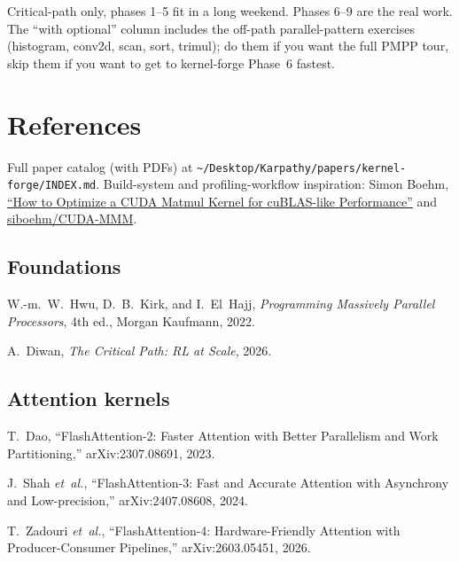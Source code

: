 \documentclass[11pt, letterpaper]{article}
\begin{document}
\medskip
Critical-path only, phases 1--5 fit in a long weekend. Phases 6--9 are the real work. The ``with optional'' column includes the off-path parallel-pattern exercises (histogram, conv2d, scan, sort, trimul); do them if you want the full PMPP tour, skip them if you want to get to kernel-forge Phase~6 fastest.

\section{References}

Full paper catalog (with PDFs) at \texttt{\~{}/Desktop/Karpathy/papers/kernel-forge/INDEX.md}. Build-system and profiling-workflow inspiration: Simon Boehm, \href{https://siboehm.com/articles/22/CUDA-MMM}{``How to Optimize a CUDA Matmul Kernel for cuBLAS-like Performance''} and \href{https://github.com/siboehm/CUDA-MMM}{siboehm/CUDA-MMM}.

\subsection*{Foundations}
\begin{enumerate}[label={[\arabic*]}]
\item W.-m.~W.~Hwu, D.~B.~Kirk, and I.~El~Hajj, \textit{Programming Massively Parallel Processors}, 4th ed., Morgan Kaufmann, 2022.
\item A.~Diwan, \textit{The Critical Path: RL at Scale}, 2026.
\end{enumerate}

\subsection*{Attention kernels}
\begin{enumerate}[resume, label={[\arabic*]}]
\item T.~Dao, ``FlashAttention-2: Faster Attention with Better Parallelism and Work Partitioning,'' arXiv:2307.08691, 2023.
\item J.~Shah \textit{et~al.}, ``FlashAttention-3: Fast and Accurate Attention with Asynchrony and Low-precision,'' arXiv:2407.08608, 2024.
\item T.~Zadouri \textit{et~al.}, ``FlashAttention-4: Hardware-Friendly Attention with Producer-Consumer Pipelines,'' arXiv:2603.05451, 2026.
\end{enumerate}
\end{document}
